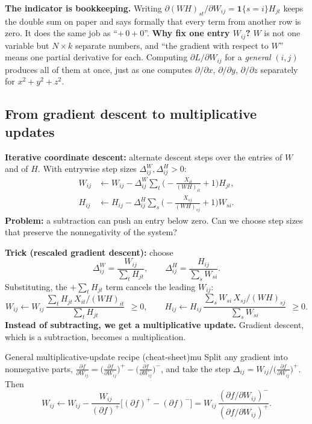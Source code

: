 \documentclass[11pt]{article}
\begin{document}
\begin{intuition}
\textbf{The indicator is bookkeeping.} Writing $\partial(WH)_{st}/\partial W_{ij}=\mathbf 1\{s=i\}H_{jt}$ keeps the double
sum on paper and says formally that every term from another row is zero. It does the same job as
``$+\,0+0$''. \textbf{Why fix one entry $W_{ij}$?} $W$ is not one variable but $N\times k$ separate numbers,
and ``the gradient with respect to $W$'' means one partial derivative for each. Computing
$\partial L/\partial W_{ij}$ for a \emph{general} $(i,j)$ produces all of them at once, just as one computes
$\partial/\partial x$, $\partial/\partial y$, $\partial/\partial z$ separately for $x^2+y^2+z^2$.
\end{intuition}

\subsection{From gradient descent to multiplicative updates}

\textbf{Iterative coordinate descent:} alternate descent steps over the entries of $W$ and of $H$.
With entrywise step sizes $\Delta^W_{ij},\Delta^H_{ij}>0$:
\begin{align*}
W_{ij}&\leftarrow W_{ij}-\Delta^W_{ij}\sum_t\Big(-\frac{X_{it}}{(WH)_{it}}+1\Big)H_{jt},\\
H_{ij}&\leftarrow H_{ij}-\Delta^H_{ij}\sum_s\Big(-\frac{X_{sj}}{(WH)_{sj}}+1\Big)W_{si}.
\end{align*}
\textbf{Problem:} a subtraction can push an entry below zero. Can we choose step sizes
that preserve the nonnegativity of the system?

\textbf{Trick (rescaled gradient descent):} choose
\[
\Delta^W_{ij}=\frac{W_{ij}}{\sum_t H_{jt}},\qquad \Delta^H_{ij}=\frac{H_{ij}}{\sum_s W_{si}} .
\]
Substituting, the $+\sum_tH_{jt}$ term cancels the leading $W_{ij}$:
\[
W_{ij}\leftarrow W_{ij}\,\frac{\sum_t H_{jt}\,X_{it}/(WH)_{it}}{\sum_t H_{jt}}\ \ \ge 0,
\qquad
H_{ij}\leftarrow H_{ij}\,\frac{\sum_s W_{si}\,X_{sj}/(WH)_{sj}}{\sum_s W_{si}}\ \ \ge0 .
\]
\textbf{Instead of subtracting, we get a multiplicative update.} Gradient descent, which
is a subtraction, becomes a multiplication.

\begin{theorem}{General multiplicative-update recipe (cheat-sheet)}{mu}
Split any gradient into nonnegative parts, $\frac{\partial f}{\partial W_{ij}}=\big(\tfrac{\partial f}{\partial W_{ij}}\big)^+-\big(\tfrac{\partial f}{\partial W_{ij}}\big)^-$,
and take the step $\Delta_{ij}=W_{ij}\big/\big(\tfrac{\partial f}{\partial W_{ij}}\big)^+$. Then
\[
W_{ij}\leftarrow W_{ij}-\frac{W_{ij}}{(\partial f)^+}\Big[(\partial f)^+-(\partial f)^-\Big]
= W_{ij}\,\frac{(\partial f/\partial W_{ij})^-}{(\partial f/\partial W_{ij})^+}.
\]
\end{theorem}
\end{document}
